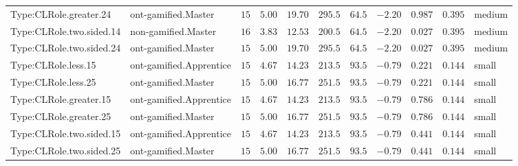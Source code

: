 \documentclass[6pt,a4paper]{article}
\begin{document}
{\begin{longtable}{llrrrrrrrrl}
Type:CLRole.greater.24&ont-gamified.Master&$15$&$5.00$&$19.70$&$ 295.5$&$ 64.5$&$-2.20$&$0.987$&$0.395$&medium\tabularnewline
Type:CLRole.two.sided.14&non-gamified.Master&$16$&$3.83$&$12.53$&$ 200.5$&$ 64.5$&$-2.20$&$0.027$&$0.395$&medium\tabularnewline
Type:CLRole.two.sided.24&ont-gamified.Master&$15$&$5.00$&$19.70$&$ 295.5$&$ 64.5$&$-2.20$&$0.027$&$0.395$&medium\tabularnewline
Type:CLRole.less.15&ont-gamified.Apprentice&$15$&$4.67$&$14.23$&$ 213.5$&$ 93.5$&$-0.79$&$0.221$&$0.144$&small\tabularnewline
Type:CLRole.less.25&ont-gamified.Master&$15$&$5.00$&$16.77$&$ 251.5$&$ 93.5$&$-0.79$&$0.221$&$0.144$&small\tabularnewline
Type:CLRole.greater.15&ont-gamified.Apprentice&$15$&$4.67$&$14.23$&$ 213.5$&$ 93.5$&$-0.79$&$0.786$&$0.144$&small\tabularnewline
Type:CLRole.greater.25&ont-gamified.Master&$15$&$5.00$&$16.77$&$ 251.5$&$ 93.5$&$-0.79$&$0.786$&$0.144$&small\tabularnewline
\newpage
Type:CLRole.two.sided.15&ont-gamified.Apprentice&$15$&$4.67$&$14.23$&$ 213.5$&$ 93.5$&$-0.79$&$0.441$&$0.144$&small\tabularnewline
Type:CLRole.two.sided.25&ont-gamified.Master&$15$&$5.00$&$16.77$&$ 251.5$&$ 93.5$&$-0.79$&$0.441$&$0.144$&small\tabularnewline
\hline
\end{longtable}}
\end{document}
